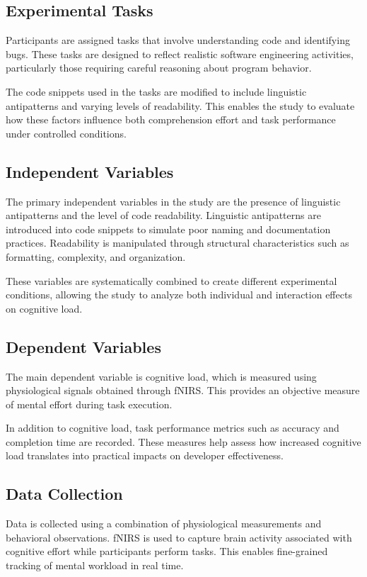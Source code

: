 \subsection{Experimental Tasks}
Participants are assigned tasks that involve understanding code and identifying bugs. These tasks are designed to reflect realistic software engineering activities, particularly those requiring careful reasoning about program behavior.

The code snippets used in the tasks are modified to include linguistic antipatterns and varying levels of readability. This enables the study to evaluate how these factors influence both comprehension effort and task performance under controlled conditions.

\subsection{Independent Variables}
The primary independent variables in the study are the presence of linguistic antipatterns and the level of code readability. Linguistic antipatterns are introduced into code snippets to simulate poor naming and documentation practices. Readability is manipulated through structural characteristics such as formatting, complexity, and organization.

These variables are systematically combined to create different experimental conditions, allowing the study to analyze both individual and interaction effects on cognitive load.

\subsection{Dependent Variables}
The main dependent variable is cognitive load, which is measured using physiological signals obtained through fNIRS. This provides an objective measure of mental effort during task execution.

In addition to cognitive load, task performance metrics such as accuracy and completion time are recorded. These measures help assess how increased cognitive load translates into practical impacts on developer effectiveness.

\subsection{Data Collection}
Data is collected using a combination of physiological measurements and behavioral observations. fNIRS is used to capture brain activity associated with cognitive effort while participants perform tasks. This enables fine-grained tracking of mental workload in real time.

